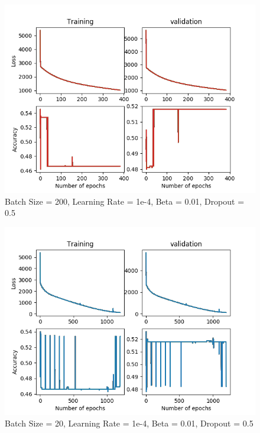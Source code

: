 \documentclass[12pt,reqno]{amsart}
\numberwithin{equation}{section}
\begin{document}
\begin{enumerate}
\begin{figure}[H]
\centering
\includegraphics[scale=0.6]{data12-1e-4-200-1e-2-5e-1}
\caption{Batch Size = 200, Learning Rate = 1e-4, Beta = 0.01, Dropout = 0.5}
\end{figure}

\begin{figure}[H]
\centering
\includegraphics[scale=0.6]{data12-1e-4-20-1e-2-5e-1}
\caption{Batch Size = 20, Learning Rate = 1e-4, Beta = 0.01, Dropout = 0.5}
\end{figure}


\end{enumerate}
\end{document}
